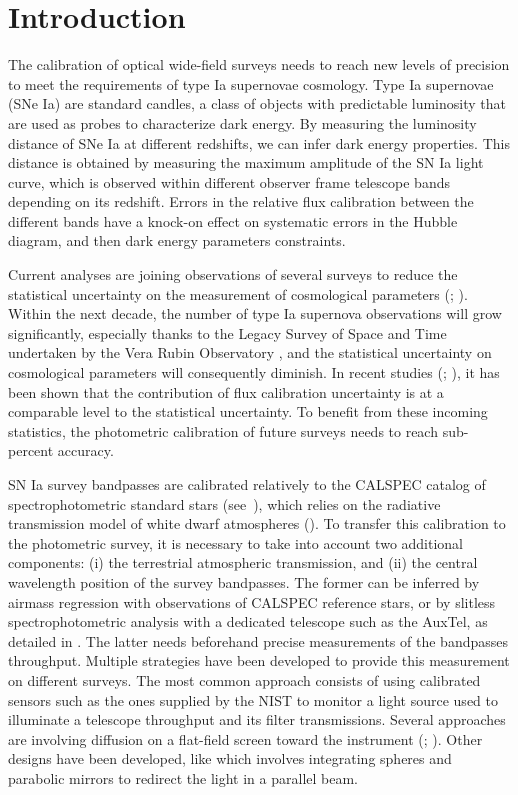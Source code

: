 \section{Introduction}

The calibration of optical wide-field surveys needs to reach new levels of precision to meet the requirements of type Ia supernovae cosmology. Type Ia supernovae (SNe Ia) are standard candles, a class of objects with predictable luminosity that are used as probes to characterize dark energy. By measuring the luminosity distance of SNe Ia at different redshifts, we can infer dark energy properties. This distance is obtained by measuring the maximum amplitude of the SN Ia light curve, which is observed within different observer frame telescope bands depending on its redshift. Errors in the relative flux calibration between the different bands have a knock-on effect on systematic errors in the Hubble diagram, and then dark energy parameters constraints.

Current analyses are joining observations of several surveys to reduce the statistical uncertainty on the measurement of cosmological parameters (\cite{Brout_2022}; \cite{rubin2023union}). Within the next decade, the number of type Ia supernova observations will grow significantly, especially thanks to the Legacy Survey of Space and Time undertaken by the Vera Rubin Observatory  \citep{lsst}, and the statistical uncertainty on cosmological parameters will consequently diminish. In recent studies (\cite{Betoule_2014}; \cite{Scolnic_2018}), it has been shown that the contribution of flux calibration uncertainty is at a comparable level to the statistical uncertainty.  To benefit from these incoming statistics, the photometric calibration of future surveys needs to reach sub-percent accuracy.

SN Ia survey bandpasses are calibrated relatively to the CALSPEC catalog of spectrophotometric standard stars (see~\cite{Bohlin_2020}), which relies on the radiative transmission model of white dwarf atmospheres (\cite{Narayan_2019}). To transfer this calibration to the photometric survey, it is necessary to take into account two additional components: (i) the terrestrial atmospheric transmission, and (ii) the central wavelength position of the survey bandpasses. The former can be inferred by airmass regression with observations of CALSPEC reference stars, or by slitless spectrophotometric analysis with a dedicated telescope such as the AuxTel, as detailed in \cite{2021ascl.soft04004N
}. The latter needs beforehand precise measurements of the bandpasses throughput. Multiple strategies have been developed to provide this measurement on different surveys. The most common approach consists of using calibrated sensors such as the ones supplied by the NIST \citep{houston2008detectors} to monitor a light source used to illuminate a telescope throughput and its filter transmissions. Several approaches are involving diffusion on a flat-field screen toward the instrument (\cite{stubbs2006}; \cite{marshall2013}). Other designs have been developed, like \cite{Lombardo_2017} which involves integrating spheres and parabolic mirrors to redirect the light in a parallel beam.

